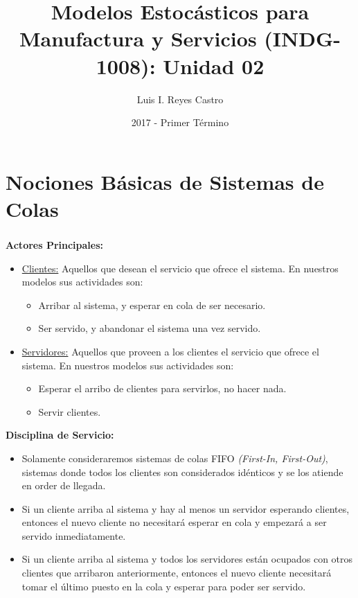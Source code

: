\documentclass[ 10pt, xcolor = dvipsnames]{beamer}
\title[\shorttitle]{Modelos Estoc\'asticos para Manufactura y Servicios (INDG-1008): \textbf{Unidad 02} }
\author[L. I. Reyes Castro]{Luis I. Reyes Castro}
\institute[ESPOL]{\normalsize Escuela Superior Polit\'ecnica del Litoral (ESPOL) \\ Guayaquil - Ecuador}
\date[2017-T1]{2017 - Primer T\'ermino}
\begin{document}




\section{Nociones B\'asicas de Sistemas de Colas}

\begin{frame}[allowframebreaks]
\frametitle{\insertsection}

\textbf{Actores Principales:}
\begin{itemize}
\item \underline{Clientes:} Aquellos que desean el servicio que ofrece el sistema. En nuestros modelos sus actividades son: 
\begin{itemize}
\item Arribar al sistema, y esperar en cola de ser necesario. 
\item Ser servido, y abandonar el sistema una vez servido. 
\end{itemize}
\item \underline{Servidores:} Aquellos que proveen a los clientes el servicio que ofrece el sistema. En nuestros modelos sus actividades son: 
\begin{itemize}
\item Esperar el arribo de clientes para servirlos, \ie no hacer nada. 
\item Servir clientes. 
\end{itemize}
\end{itemize}
\framebreak

\textbf{Disciplina de Servicio:}
\begin{itemize}
\item Solamente consideraremos sistemas de colas FIFO \emph{(First-In, First-Out)}, \ie sistemas donde todos los clientes son considerados id\'enticos y se los atiende en order de llegada. 
\item Si un cliente arriba al sistema y hay al menos un servidor esperando clientes, entonces el nuevo cliente no necesitar\'a esperar en cola y empezar\'a a ser servido inmediatamente. 
\item Si un cliente arriba al sistema y todos los servidores est\'an ocupados con otros clientes que arribaron anteriormente, entonces el nuevo cliente necesitar\'a tomar el \'ultimo puesto en la cola y esperar para poder ser servido. 
\end{itemize}
\framebreak


\end{frame}
\end{document}

